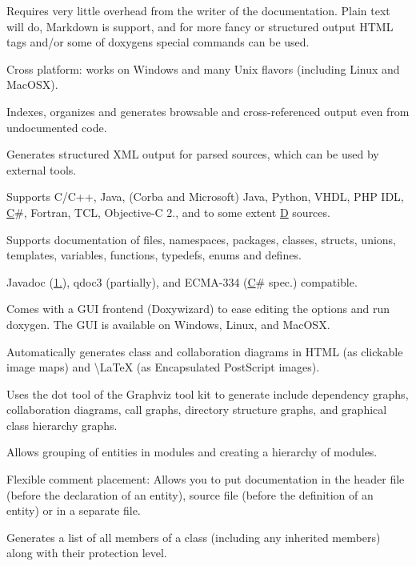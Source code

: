\begin{DoxyItemize}
\item Requires very little overhead from the writer of the documentation. Plain text will do, Markdown is support, and for more fancy or structured output H\+T\+ML tags and/or some of doxygen\textquotesingle{}s special commands can be used. 
\item Cross platform\+: works on Windows and many Unix flavors (including Linux and Mac\+O\+SX). 
\item Indexes, organizes and generates browsable and cross-\/referenced output even from undocumented code. 
\item Generates structured X\+ML output for parsed sources, which can be used by external tools. 
\item Supports C/\+C++, Java, (Corba and Microsoft) Java, Python, V\+H\+DL, P\+HP I\+DL, \mbox{\hyperlink{class_c}{C}}\#, Fortran, T\+CL, Objective-\/C 2., and to some extent \mbox{\hyperlink{class_d}{D}} sources. 
\item Supports documentation of files, namespaces, packages, classes, structs, unions, templates, variables, functions, typedefs, enums and defines. 
\item Javadoc (\mbox{\hyperlink{namespace1_1_11}{1.}}), qdoc3 (partially), and E\+C\+M\+A-\/334 (\mbox{\hyperlink{class_c}{C}}\# spec.) compatible. 
\item Comes with a G\+UI frontend (Doxywizard) to ease editing the options and run doxygen. The G\+UI is available on Windows, Linux, and Mac\+O\+SX. 
\item Automatically generates class and collaboration diagrams in H\+T\+ML (as clickable image maps) and \textbackslash{}\+La\+TeX (as Encapsulated Post\+Script images). 
\item Uses the {\ttfamily dot} tool of the Graphviz tool kit to generate include dependency graphs, collaboration diagrams, call graphs, directory structure graphs, and graphical class hierarchy graphs. 
\item Allows grouping of entities in modules and creating a hierarchy of modules. 
\item Flexible comment placement\+: Allows you to put documentation in the header file (before the declaration of an entity), source file (before the definition of an entity) or in a separate file. 
\item Generates a list of all members of a class (including any inherited members) along with their protection level. 

\end{DoxyItemize}
